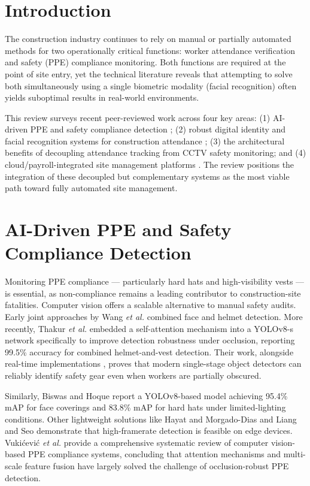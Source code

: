 \documentclass[conference]{IEEEtran}
\begin{document}
\section{Introduction}
The construction industry continues to rely on manual or partially automated methods for two operationally critical functions: worker attendance verification and safety (PPE) compliance monitoring. Both functions are required at the point of site entry, yet the technical literature reveals that attempting to solve both simultaneously using a single biometric modality (facial recognition) often yields suboptimal results in real-world environments.

This review surveys recent peer-reviewed work across four key areas: (1) AI-driven PPE and safety compliance detection \cite{wang2020, mishra2026, thakur2023, biswas2024, ijarcce2025, hayat2022, liang2022, vukicevic2024}; (2) robust digital identity and facial recognition systems for construction attendance \cite{ashritha2022, khadepatil2022, gururaj2021, pawar2023, kapil2020}; (3) the architectural benefits of decoupling attendance tracking from CCTV safety monitoring; and (4) cloud/payroll-integrated site management platforms \cite{bao2023, pavelko2023, gado2024, manu2024, ye2022}. The review positions the integration of these decoupled but complementary systems as the most viable path toward fully automated site management.

\section{AI-Driven PPE and Safety Compliance Detection}
Monitoring PPE compliance — particularly hard hats and high-visibility vests — is essential, as non-compliance remains a leading contributor to construction-site fatalities. Computer vision offers a scalable alternative to manual safety audits. Early joint approaches by Wang \textit{et al.} \cite{wang2020} combined face and helmet detection. More recently, Thakur \textit{et al.} \cite{thakur2023} embedded a self-attention mechanism into a YOLOv8-s network specifically to improve detection robustness under occlusion, reporting 99.5\% accuracy for combined helmet-and-vest detection. Their work, alongside real-time implementations \cite{ijarcce2025}, proves that modern single-stage object detectors can reliably identify safety gear even when workers are partially obscured.

Similarly, Biswas and Hoque \cite{biswas2024} report a YOLOv8-based model achieving 95.4\% mAP for face coverings and 83.8\% mAP for hard hats under limited-lighting conditions. Other lightweight solutions like Hayat and Morgado-Dias \cite{hayat2022} and Liang and Seo \cite{liang2022} demonstrate that high-framerate detection is feasible on edge devices. Vukićević \textit{et al.} \cite{vukicevic2024} provide a comprehensive systematic review of computer vision-based PPE compliance systems, concluding that attention mechanisms and multi-scale feature fusion have largely solved the challenge of occlusion-robust PPE detection.
\end{document}
